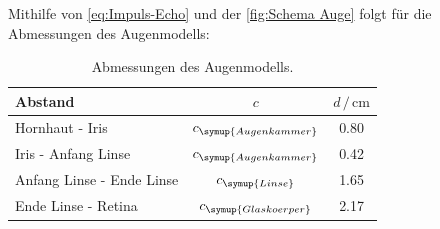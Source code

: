 Mithilfe von \eqref{eq:Impuls-Echo} und der \autoref{fig:Schema Auge} folgt für die Abmessungen des Augenmodells:
\begin{table}[H]
  \centering
  \caption{Abmessungen des Augenmodells.}
  \label{tab:Abmessungen Auge}
  \begin{tabular}{l c S[table-format=1.2]}
      \toprule
       {Abstand} & {$c$} & {$d\,/\,\unit{\centi\meter}$} \\
      \midrule
         {Hornhaut - Iris} & {$c_{\symup{Augenkammer}}$}      & {\num{0.80}} \\
         {Iris - Anfang Linse} & {$c_{\symup{Augenkammer}}$}  & {\num{0.42}} \\
         {Anfang Linse - Ende Linse} & {$c_{\symup{Linse}}$}  & {\num{1.65}} \\
         {Ende Linse - Retina} & {$c_{\symup{Glaskoerper}}$}  & {\num{2.17}} \\
      \bottomrule 
  \end{tabular}
\end{table}

